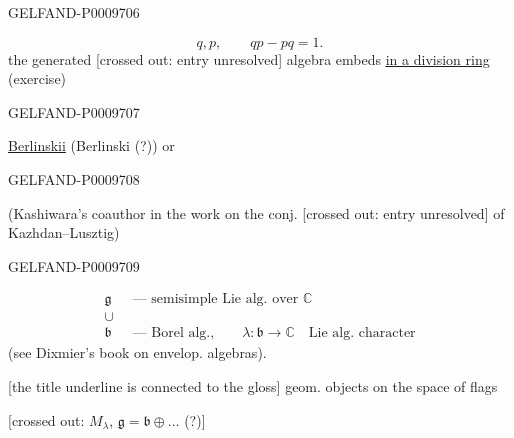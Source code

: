 \begin{GelfandAdjacentEvidence}{GELFAND-P000970}{6}

\[
 q,p,\qquad qp-pq=1.
\]
the generated [crossed out: entry unresolved] algebra embeds \underline{\underline{in a division ring}} (exercise)
\end{GelfandAdjacentEvidence}
\begin{GelfandAdjacentEvidence}{GELFAND-P000970}{7}


\underline{Berlinskii} (Berlinski (?)) or 
\end{GelfandAdjacentEvidence}
\begin{GelfandAdjacentEvidence}{GELFAND-P000970}{8}


(Kashiwara’s coauthor in the work on the conj. [crossed out: entry unresolved] of Kazhdan–Lusztig)
\end{GelfandAdjacentEvidence}
\begin{GelfandAdjacentEvidence}{GELFAND-P000970}{9}

\[
\begin{aligned}
 \mathfrak g&\text{ --- semisimple Lie alg. over }\mathbb C\\
 \cup\ &\\
 \mathfrak b&\text{ --- Borel alg.,}\qquad
 \lambda\colon\mathfrak b\to\mathbb C\quad\text{Lie alg. character}
\end{aligned}
\]
\quad (see Dixmier’s book on envelop. algebras).

[the title underline is connected to the gloss] geom. objects on the space of flags

[crossed out: \(M_\lambda\), \(\mathfrak g=\mathfrak b\oplus\ldots\) (?)]
\end{GelfandAdjacentEvidence}
